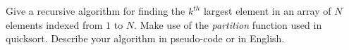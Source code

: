 Give a recursive algorithm for finding the $k^{th}$ largest element in an
array of $N$ elements indexed from $1$ to $N$.  Make use of the
{\em partition} function used in quicksort.  Describe your algorithm in
pseudo-code or in English.
